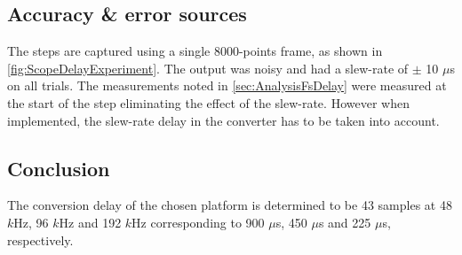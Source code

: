 \subsection{Accuracy \& error sources}

The steps are captured using a single 8000-points frame, as shown in \autoref{fig:ScopeDelayExperiment}. The output was noisy and had a slew-rate of $\pm$ 10 $\mu $s on all trials. The measurements noted in \autoref{sec:AnalysisFsDelay} were measured at the start of the step eliminating the effect of the slew-rate. However when implemented, the slew-rate delay in the converter has to be taken into account.


\subsection{Conclusion}
The conversion delay of the chosen platform is determined to be 43 samples at 48 $k$Hz, 96 $k$Hz and 192 $k$Hz corresponding to 900 $\mu$s, 450 $\mu$s and 225 $\mu$s, respectively.

